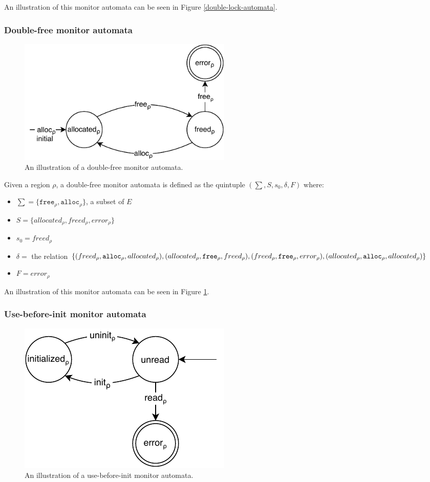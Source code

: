 An illustration of this monitor automata can be seen in Figure \ref{double-lock-automata}. 

\subsubsection{Double-free monitor automata}

\begin{figure}[H]
    \centering
    \includegraphics[width=0.5\textwidth]{background/figures/double-free}
    \caption{An illustration of a double-free monitor automata.}
    \label{double-free-automata}
\end{figure}

Given a region $\rho$, a double-free monitor automata is defined as the quintuple $(\sum, S, s_0, \delta, F)$ where: 

\begin{itemize}
    \item $\sum = \{\texttt{free}_\rho, \texttt{alloc}_\rho\}$, a subset of $E$
    \item $S = \{ allocated_\rho, freed_\rho, error_\rho \}$
    \item $s_0 = freed_\rho$ 
    \item $\delta =$ the relation $\{(freed_\rho, \texttt{alloc}_\rho, allocated_\rho), (allocated_\rho, \texttt{free}_\rho, freed_\rho), \\
    (freed_\rho, \texttt{free}_\rho, error_\rho), (allocated_\rho, \texttt{alloc}_\rho, allocated_\rho)\}$ 
    \item $F = error_\rho$  
\end{itemize}

An illustration of this monitor automata can be seen in Figure \ref{double-free-automata}. 

\subsubsection{Use-before-init monitor automata}

\begin{figure}[H]
    \centering
    \includegraphics[width=0.5\textwidth]{background/figures/use-before}
    \caption{An illustration of a use-before-init monitor automata.}
    \label{use-before-automata}
\end{figure}

